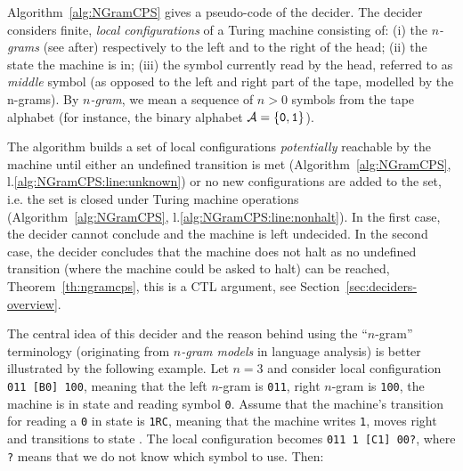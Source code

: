 \begin{algorithm}
\begin{algorithmic}[1]
        \EndWhile
    \end{algorithmic}
\end{algorithm}






Algorithm~\ref{alg:NGramCPS} gives a pseudo-code of the \ngramcps decider. The decider considers finite, \textit{local configurations} of a Turing machine consisting of: (i) the \textit{$n$-grams} (see after) respectively to the left and to the right of the head; (ii) the state the machine is in; (iii) the symbol currently read by the head, referred to as \textit{middle} symbol (as opposed to the left and right part of the tape, modelled by the n-grams). By \textit{$n$-gram}, we mean a sequence of $n > 0$ symbols from the tape alphabet (for instance, the binary alphabet $\mathcal{A}=\{\texttt{0},\texttt{1}\}$).

The algorithm builds a set of local configurations \textit{potentially} reachable by the machine until either an undefined transition is met (Algorithm~\ref{alg:NGramCPS}, l.\ref{alg:NGramCPS:line:unknown}) or no new configurations are added to the set, i.e. the set is closed under Turing machine operations (Algorithm~\ref{alg:NGramCPS}, l.\ref{alg:NGramCPS:line:nonhalt}). In the first case, the decider cannot conclude and the machine is left undecided. In the second case, the decider concludes that the machine does not halt as no undefined transition (\ie where the machine could be asked to halt) can be reached, Theorem~\ref{th:ngramcps}, this is a CTL argument, see Section~\ref{sec:deciders-overview}.

The central idea of this decider and the reason behind using the ``$n$-gram'' terminology (originating from \textit{$n$-gram models} in language analysis)  is better illustrated by the following example. Let $n=3$ and consider local configuration \texttt{011 [B0] 100}, meaning that the left $n$-gram is \texttt{011}, right $n$-gram is \texttt{100}, the machine is in state \stateB and reading symbol \texttt{0}. Assume that the  machine's transition for reading a \texttt{0} in state \stateB is \texttt{1RC}, meaning that the machine writes \texttt{1}, moves right and transitions to state \stateC. The local configuration becomes \texttt{011 1 [C1] 00?}, where \texttt{?} means that we do not know which symbol to use. Then:

